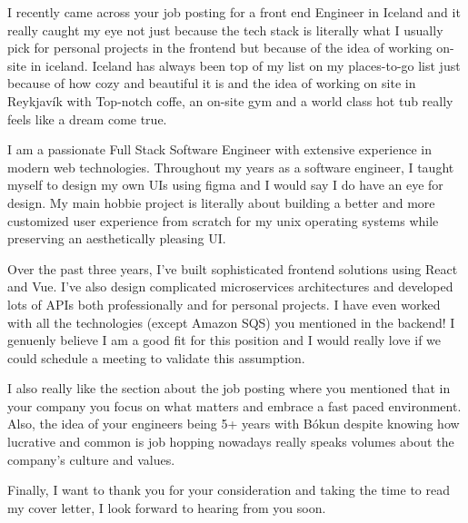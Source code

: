 I recently came across your job posting for a front end Engineer in Iceland and it really caught my eye not just because the tech stack is literally what I usually pick for personal projects in the frontend but because of the idea of working on-site in iceland. Iceland has always been top of my list on my places-to-go list just because of how cozy and beautiful it is and the idea of working on site in Reykjavík with Top-notch coffe, an on-site gym and a world class hot tub really feels like a dream come true.

I am a passionate Full Stack Software Engineer with extensive experience in modern web technologies. Throughout my years as a software engineer, I taught myself to design my own UIs using figma and I would say I do have an eye for design. My main hobbie project is literally about building a better and more customized user experience from scratch for my unix operating systems while preserving an aesthetically pleasing UI.

Over the past three years, I've built sophisticated frontend solutions using React and Vue. I've also design complicated microservices architectures and developed lots of APIs both professionally and for personal projects. I have even worked with all the technologies (except Amazon SQS) you mentioned in the backend! I genuenly believe I am a good fit for this position and I would really love if we could schedule a meeting to validate this assumption.

I also really like the section about the job posting where you mentioned that in your company you focus on what matters and embrace a fast paced environment. Also, the idea of your engineers being 5+ years with Bókun despite knowing how lucrative and common is job hopping nowadays really speaks volumes about the company's culture and values.

Finally, I want to thank you for your consideration and taking the time to read my cover letter, I look forward to hearing from you soon.
